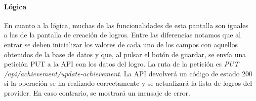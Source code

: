\paragraph*{Lógica}
En cuanto a la lógica, muchas de las funcionalidades de esta pantalla son iguales a las de la pantalla de creación de logros.
Entre las diferencias notamos que al entrar se deben inicializar los valores de cada uno de los campos con aquellos obtenidos de la base de datos y que, al pulsar el botón de guardar, se envía una petición PUT a la API con los datos del logro. La ruta de la petición es \textit{PUT /api/achievement/update-achievement}. La API devolverá un código de estado 200 si la operación se ha realizado correctamente y se actualizará la lista de logros del provider. En caso contrario, se mostrará un mensaje de error.

